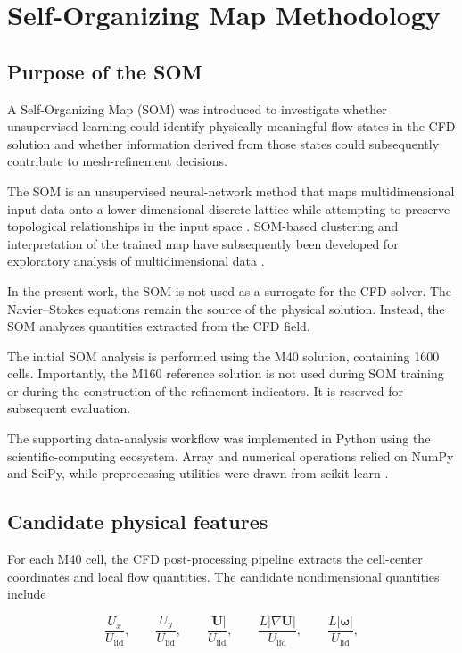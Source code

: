 \section{Self-Organizing Map Methodology}
\label{sec:som_methodology}

\subsection{Purpose of the SOM}

A Self-Organizing Map (SOM) was introduced to investigate whether
unsupervised learning could identify physically meaningful flow states in the
CFD solution and whether information derived from those states could
subsequently contribute to mesh-refinement decisions.

The SOM is an unsupervised neural-network method that maps multidimensional
input data onto a lower-dimensional discrete lattice while attempting to
preserve topological relationships in the input space
\cite{kohonen1982,kohonen2001}. SOM-based clustering and interpretation of
the trained map have subsequently been developed for exploratory analysis of
multidimensional data \cite{vesanto2000}.

In the present work, the SOM is not used as a surrogate for the CFD solver.
The Navier--Stokes equations remain the source of the physical solution.
Instead, the SOM analyzes quantities extracted from the CFD field.

The initial SOM analysis is performed using the M40 solution, containing
1600 cells. Importantly, the M160 reference solution is not used during SOM
training or during the construction of the refinement indicators. It is
reserved for subsequent evaluation.

The supporting data-analysis workflow was implemented in Python using the
scientific-computing ecosystem. Array and numerical operations relied on
NumPy and SciPy, while preprocessing utilities were drawn from
scikit-learn \cite{harris2020,virtanen2020,pedregosa2011}.

\subsection{Candidate physical features}

For each M40 cell, the CFD post-processing pipeline extracts the cell-center
coordinates and local flow quantities. The candidate nondimensional
quantities include

\begin{equation}
\frac{U_x}{U_{\mathrm{lid}}},
\qquad
\frac{U_y}{U_{\mathrm{lid}}},
\qquad
\frac{|\mathbf{U}|}{U_{\mathrm{lid}}},
\qquad
\frac{L|\nabla\mathbf{U}|}{U_{\mathrm{lid}}},
\qquad
\frac{L|\boldsymbol{\omega}|}{U_{\mathrm{lid}}},
\end{equation}

